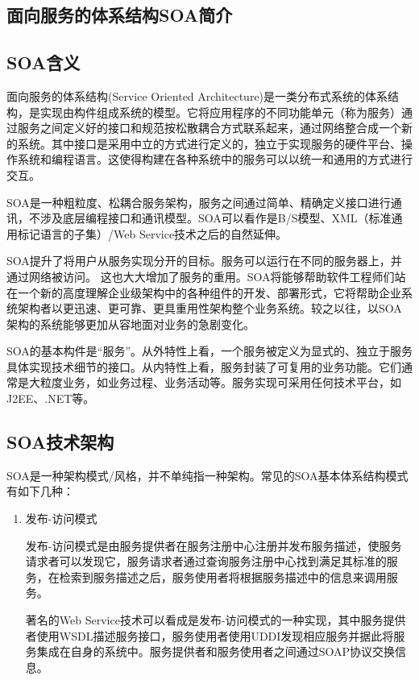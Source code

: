 \documentclass[11pt,a4paper]{article}
\begin{document}
\begin{CJK}{UTF8}{gbsn}
\section{面向服务的体系结构SOA简介}

\subsection{SOA含义}

面向服务的体系结构(Service Oriented Architecture)是一类分布式系统的体系结构，是实现由构件组成系统的模型。它将应用程序的不同功能单元（称为服务）通过服务之间定义好的接口和规范按松散耦合方式联系起来，通过网络整合成一个新的系统。其中接口是采用中立的方式进行定义的，独立于实现服务的硬件平台、操作系统和编程语言。这使得构建在各种系统中的服务可以以统一和通用的方式进行交互。


SOA是一种粗粒度、松耦合服务架构，服务之间通过简单、精确定义接口进行通讯，不涉及底层编程接口和通讯模型。SOA可以看作是B/S模型、XML（标准通用标记语言的子集）/Web Service技术之后的自然延伸。

SOA提升了将用户从服务实现分开的目标。服务可以运行在不同的服务器上，并通过网络被访问。 这也大大增加了服务的重用。SOA将能够帮助软件工程师们站在一个新的高度理解企业级架构中的各种组件的开发、部署形式，它将帮助企业系统架构者以更迅速、更可靠、更具重用性架构整个业务系统。较之以往，以SOA架构的系统能够更加从容地面对业务的急剧变化。

SOA的基本构件是“服务”。从外特性上看，一个服务被定义为显式的、独立于服务具体实现技术细节的接口。从内特性上看，服务封装了可复用的业务功能。它们通常是大粒度业务，如业务过程、业务活动等。服务实现可采用任何技术平台，如J2EE、.NET等。

\subsection{SOA技术架构}

SOA是一种架构模式/风格，并不单纯指一种架构。常见的SOA基本体系结构模式有如下几种：

\begin{enumerate}

\item 发布-访问模式

    发布-访问模式是由服务提供者在服务注册中心注册并发布服务描述，使服务请求者可以发现它，服务请求者通过查询服务注册中心找到满足其标准的服务，在检索到服务描述之后，服务使用者将根据服务描述中的信息来调用服务。

    著名的Web Service技术可以看成是发布-访问模式的一种实现，其中服务提供者使用WSDL描述服务接口，服务使用者使用UDDI发现相应服务并据此将服务集成在自身的系统中。服务提供者和服务使用者之间通过SOAP协议交换信息。


\end{enumerate}
\end{CJK}
\end{document}
